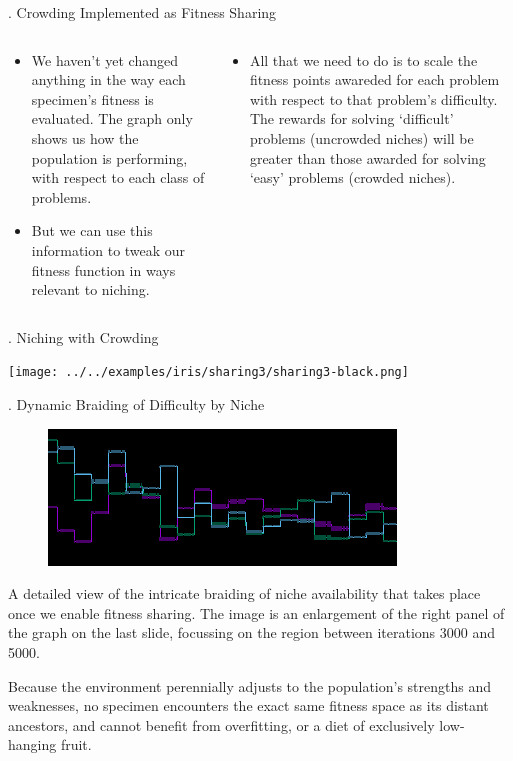 \documentclass[9pt]{beamer}
\begin{document}
\begin{frame}{\theframenumber. Crowding Implemented as Fitness Sharing}
  \begin{columns}
    \begin{column}{.5\textwidth}
      \begin{itemize}
      \item We haven't yet changed anything in the way each specimen's fitness is evaluated. The graph only shows us how the population is performing, with respect to each class of problems.
      \item But we can use this information to tweak our fitness function in ways relevant to niching.
      \end{itemize}
    \end{column}
    \begin{column}{.5\textwidth}
      \begin{itemize}
      \item All that we need to do is to scale the fitness points awareded for each problem with respect to that problem's difficulty. The rewards for solving `difficult' problems (uncrowded niches) will be greater than those awarded for solving `easy' problems (crowded niches). 
      \end{itemize}
    \end{column}
    \end{columns}

\end{frame}

\begin{frame}{\theframenumber. Niching with Crowding}
  \begin{center}
  \texttt{[image: ../../examples/iris/sharing3/sharing3-black.png]}
  \end{center}
\end{frame}

\begin{frame}{\theframenumber. Dynamic Braiding of Difficulty by Niche}
  \begin{figure}
    \includegraphics[width=\textwidth]{../images/braiding.png}
  \end{figure}
  A detailed view of the intricate braiding of niche availability that takes place once we enable fitness sharing. The image is an enlargement of the right panel of the graph on the last slide, focussing on the region between iterations 3000 and 5000.
\vspace{8pt}

  Because the environment perennially adjusts to the population's strengths and weaknesses, no specimen encounters the exact same fitness space as its distant ancestors, and cannot benefit from overfitting, or a diet of exclusively low-hanging fruit.
\end{frame}
\end{document}
